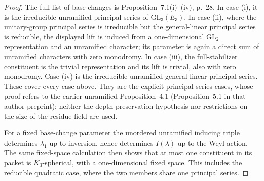 \documentclass[11pt,a4paper]{article}
\theoremstyle{definition}
\begin{document}
\begin{proof}
The full list of base changes is Proposition~7.1(i)--(iv), p.~28.
In case (i), it is the irreducible unramified principal series of
$\mathrm{GL}_3(E_3)$. In case (ii), where the unitary-group principal
series is irreducible but the general-linear principal series is
reducible, the displayed lift is induced from a one-dimensional
$\mathrm{GL}_2$ representation and an unramified character; its
parameter is again a direct sum of unramified characters with zero
monodromy. In case (iii), the full-stabilizer constituent is the trivial
representation and its lift is trivial, also with zero monodromy.
Case (iv) is the irreducible unramified general-linear principal series.
These cover every case above. They are the explicit principal-series
cases, whose proof refers to the earlier unramified Proposition~4.1
(Proposition~5.1 in that author preprint); neither the depth-preservation
hypothesis nor restrictions on the size of the residue field are used.

For a fixed base-change parameter the unordered unramified inducing
triple determines $\lambda_1$ up to inversion, hence determines
$I(\lambda)$ up to the Weyl action. The same fixed-space calculation
then shows that at most one constituent in its packet is $K_3$-spherical,
with a one-dimensional fixed space. This includes the reducible
quadratic case, where the two members share one principal series.
\end{proof}
\end{document}
